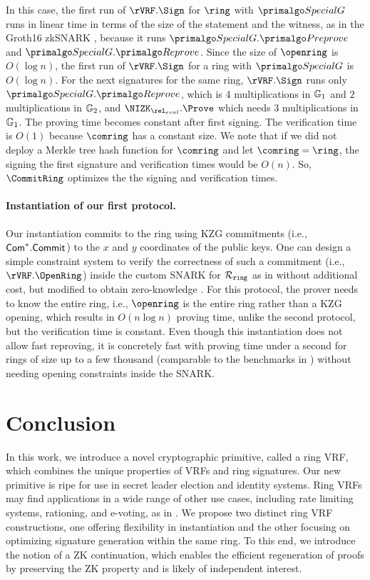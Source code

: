 In this case, the first run of $\rVRF.\Sign$ for $\ring$ with $ \SpecialG $ runs in linear time in terms of the size of the statement and the witness, as in the Groth16 zkSNARK \cite{Groth16}, because it runs $ \SpecialG.\Preprove $ and $ \SpecialG.\Reprove $. Since the size of $ \openring $ is
$ O(\log n) $, the first run of $\rVRF.\Sign$ for a ring with $ \SpecialG $ is $ O(\log n) $.
For the next signatures for the same ring,  $\rVRF.\Sign$  runs only  $\SpecialG.\Reprove$, which is 4 multiplications in $\mathbb{G}_1 $ and $2$ multiplications in $\mathbb{G}_2$, and  $\NIZK_{\rel_{eval}}.\Prove$ which needs  3 multiplications in $ \mathbb{G}_1 $.  The proving time becomes constant after first signing. 
The verification time is $ O(1) $ because $ \comring $ has a constant size.
We note that if we did not deploy a Merkle tree hash function for $ \comring $ and let $ \comring = \ring $, the signing the first signature and verification times would be $ O(n) $. So, $ \CommitRing $ optimizes the the signing and verification times.

\paragraph{Instantiation of our first protocol.}  Our instantiation commits to the ring using KZG commitments (i.e., $ \mathsf{Com}^*.\mathsf{Commit} $) to the $ x $ and $ y $ coordinates of the public keys.
One can design a simple constraint system to verify the correctness of such a commitment (i.e., $ \rVRF.\OpenRing $) inside the custom SNARK for $\mathcal{R}_{\mathtt{ring}}$ as in \cite{accountable} without additional cost, but  modified to obtain zero-knowledge \cite{plonk}.  For this protocol, the prover needs to know the entire ring, i.e., $\openring$ is the entire ring rather than a KZG opening, which results in $O(n \log n)$ proving time, unlike the second protocol, but the verification time is constant. Even though this instantiation  does not allow fast reproving,  it is concretely fast with proving time under a second for rings of size up to a few thousand (comparable to the benchmarks in \cite{accountable}) without needing opening constraints inside the SNARK. 

\section{Conclusion}\label{sec:conclusion}

In this work, we introduce a novel cryptographic primitive, called a ring VRF, which combines the unique properties of VRFs  and ring signatures. Our new primitive is ripe for use in secret leader election and identity systems.  Ring VRFs may find applications in a wide range of other use cases, including rate limiting systems, rationing, and e-voting, as in \cite{Semaphore}. We propose two distinct ring VRF constructions, one offering flexibility in instantiation and the other focusing on optimizing signature generation within the same ring. To this end, we introduce the notion of a ZK continuation, which enables the efficient regeneration of proofs by preserving the ZK property and is likely of independent interest.

